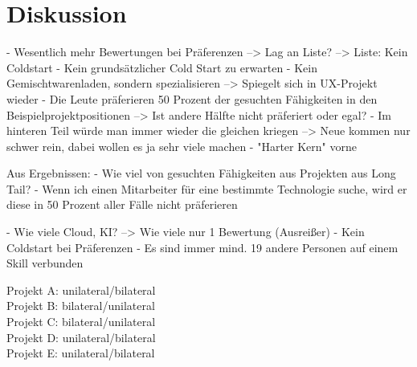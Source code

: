 \chapter{Diskussion}
\label{ch:diskussion}
- Wesentlich mehr Bewertungen bei Präferenzen --> Lag an Liste? --> Liste: Kein Coldstart
- Kein grundsätzlicher Cold Start zu erwarten
- Kein Gemischtwarenladen, sondern spezialisieren --> Spiegelt sich in UX-Projekt wieder
- Die Leute präferieren 50 Prozent der gesuchten Fähigkeiten in den Beispielprojektpositionen --> Ist andere Hälfte nicht präferiert oder egal?
- Im hinteren Teil würde man immer wieder die gleichen kriegen --> Neue kommen nur schwer rein, dabei wollen es ja sehr viele machen
- "Harter Kern" vorne

Aus Ergebnissen:
- Wie viel von gesuchten Fähigkeiten aus Projekten aus Long Tail?
- Wenn ich einen Mitarbeiter für eine bestimmte Technologie suche, wird er diese in 50 Prozent aller Fälle nicht präferieren

- Wie viele Cloud, KI? --> Wie viele nur 1 Bewertung (Ausreißer)
- Kein Coldstart bei Präferenzen
- Es sind immer mind. 19 andere Personen auf einem Skill verbunden

Projekt A: unilateral/bilateral\\
Projekt B: bilateral/unilateral\\
Projekt C: bilateral/unilateral\\
Projekt D: unilateral/bilateral\\
Projekt E: unilateral/bilateral


